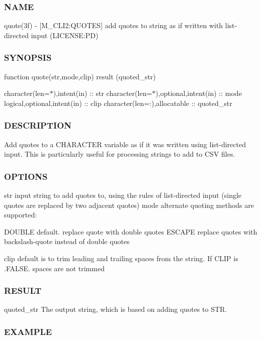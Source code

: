\subsubsection*{N\+A\+ME}

quote(3f) -\/ \mbox{[}M\+\_\+\+C\+L\+I2\+:Q\+U\+O\+T\+ES\mbox{]} add quotes to string as if written with list-\/directed input (L\+I\+C\+E\+N\+SE\+:PD) \subsubsection*{S\+Y\+N\+O\+P\+S\+IS}

function quote(str,mode,clip) result (quoted\+\_\+str)

character(len=$\ast$),intent(in) \+:\+: str character(len=$\ast$),optional,intent(in) \+:\+: mode logical,optional,intent(in) \+:\+: clip character(len=\+:),allocatable \+:\+: quoted\+\_\+str \subsubsection*{D\+E\+S\+C\+R\+I\+P\+T\+I\+ON}

Add quotes to a C\+H\+A\+R\+A\+C\+T\+ER variable as if it was written using list-\/directed input. This is particularly useful for processing strings to add to C\+SV files.

\subsubsection*{O\+P\+T\+I\+O\+NS}

str input string to add quotes to, using the rules of list-\/directed input (single quotes are replaced by two adjacent quotes) mode alternate quoting methods are supported\+: \begin{DoxyVerb}           DOUBLE   default. replace quote with double quotes
           ESCAPE   replace quotes with backslash-quote instead of double quotes
\end{DoxyVerb}


clip default is to trim leading and trailing spaces from the string. If C\+L\+IP is .F\+A\+L\+SE. spaces are not trimmed

\subsubsection*{R\+E\+S\+U\+LT}

quoted\+\_\+str The output string, which is based on adding quotes to S\+TR. \subsubsection*{E\+X\+A\+M\+P\+LE}

